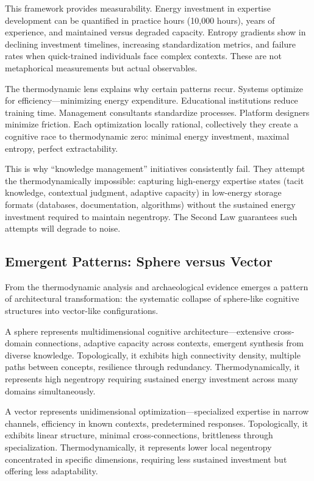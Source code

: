 This framework provides measurability. Energy investment in expertise development can be quantified in practice hours \citep{ericsson1993} (10,000 hours), years of experience, and maintained versus degraded capacity. Entropy gradients show in declining investment timelines, increasing standardization metrics, and failure rates when quick-trained individuals face complex contexts. These are not metaphorical measurements but actual observables.

The thermodynamic lens explains why certain patterns recur. Systems optimize for efficiency---minimizing energy expenditure. Educational institutions reduce training time. Management consultants standardize processes. Platform designers minimize friction. Each optimization locally rational, collectively they create a cognitive race to thermodynamic zero: minimal energy investment, maximal entropy, perfect extractability.

This is why ``knowledge management'' initiatives consistently fail. They attempt the thermodynamically impossible: capturing high-energy expertise states (tacit knowledge, contextual judgment, adaptive capacity) in low-energy storage formats (databases, documentation, algorithms) without the sustained energy investment required to maintain negentropy. The Second Law guarantees such attempts will degrade to noise.

\subsection{Emergent Patterns: Sphere versus Vector}

From the thermodynamic analysis and archaeological evidence emerges a pattern of architectural transformation: the systematic collapse of sphere-like cognitive structures into vector-like configurations.

A sphere represents multidimensional cognitive architecture---extensive cross-domain connections, adaptive capacity across contexts, emergent synthesis from diverse knowledge. Topologically, it exhibits high connectivity density, multiple paths between concepts, resilience through redundancy. Thermodynamically, it represents high negentropy requiring sustained energy investment across many domains simultaneously.

A vector represents unidimensional optimization---specialized expertise in narrow channels, efficiency in known contexts, predetermined responses. Topologically, it exhibits linear structure, minimal cross-connections, brittleness through specialization. Thermodynamically, it represents lower local negentropy concentrated in specific dimensions, requiring less sustained investment but offering less adaptability.

